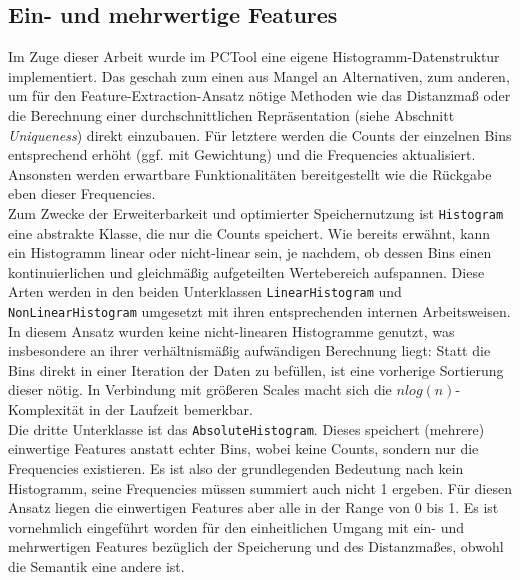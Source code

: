 \subsection{Ein- und mehrwertige Features} 

Im Zuge dieser Arbeit wurde im PCTool eine eigene Histogramm-Datenstruktur implementiert. Das geschah zum einen aus Mangel an Alternativen, zum anderen, um für den Feature-Extraction-Ansatz nötige Methoden wie das Distanzmaß oder die Berechnung einer durchschnittlichen Repräsentation (siehe Abschnitt \textit{Uniqueness}) direkt einzubauen. Für letztere werden die Counts der einzelnen Bins entsprechend erhöht (ggf. mit Gewichtung) und die Frequencies aktualisiert. Ansonsten werden erwartbare Funktionalitäten bereitgestellt wie die Rückgabe eben dieser Frequencies. \\
Zum Zwecke der Erweiterbarkeit und optimierter Speichernutzung ist \texttt{Histogram} eine abstrakte Klasse, die nur die Counts speichert. Wie bereits erwähnt, kann ein Histogramm linear oder nicht-linear sein, je nachdem, ob dessen Bins einen kontinuierlichen und gleichmäßig aufgeteilten Wertebereich aufspannen. Diese Arten werden in den beiden Unterklassen \texttt{LinearHistogram} und \texttt{NonLinearHistogram} umgesetzt mit ihren entsprechenden internen Arbeitsweisen. In diesem Ansatz wurden keine nicht-linearen Histogramme genutzt, was insbesondere an ihrer verhältnismäßig aufwändigen Berechnung liegt: Statt die Bins direkt in einer Iteration der Daten zu befüllen, ist eine vorherige Sortierung dieser nötig. In Verbindung mit größeren Scales macht sich die $nlog(n)$-Komplexität in der Laufzeit bemerkbar. \\ 
Die dritte Unterklasse ist das \texttt{AbsoluteHistogram}. Dieses speichert (mehrere) einwertige Features anstatt echter Bins, wobei keine Counts, sondern nur die Frequencies existieren. Es ist also der grundlegenden Bedeutung nach kein Histogramm, seine Frequencies müssen summiert auch nicht 1 ergeben. Für diesen Ansatz liegen die einwertigen Features aber alle in der Range von 0 bis 1. Es ist vornehmlich eingeführt worden für den einheitlichen Umgang mit ein- und mehrwertigen Features bezüglich der Speicherung und des Distanzmaßes, obwohl die Semantik eine andere ist. \\
